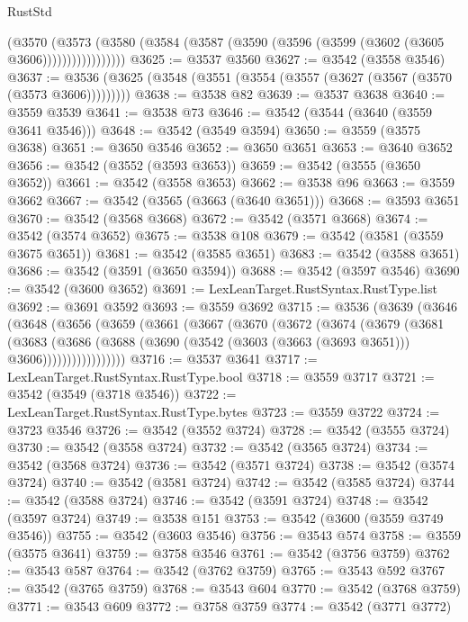 \begin{lexlean}{RustStd}
\begin{coremodule}
                  (@3570
                    (@3573
                      (@3580 (@3584 (@3587 (@3590 (@3596 (@3599 (@3602 (@3605 @3606)))))))))))))))))
@3625 := @3537 @3560
@3627 := @3542 (@3558 @3546)
@3637 := @3536 (@3625 (@3548 (@3551 (@3554 (@3557 (@3627 (@3567 (@3570 (@3573 @3606)))))))))
@3638 := @3538 @82
@3639 := @3537 @3638
@3640 := @3559 @3539
@3641 := @3538 @73
@3646 := @3542 (@3544 (@3640 (@3559 @3641 @3546)))
@3648 := @3542 (@3549 @3594)
@3650 := @3559 (@3575 @3638)
@3651 := @3650 @3546
@3652 := @3650 @3651
@3653 := @3640 @3652
@3656 := @3542 (@3552 (@3593 @3653))
@3659 := @3542 (@3555 (@3650 @3652))
@3661 := @3542 (@3558 @3653)
@3662 := @3538 @96
@3663 := @3559 @3662
@3667 := @3542 (@3565 (@3663 (@3640 @3651)))
@3668 := @3593 @3651
@3670 := @3542 (@3568 @3668)
@3672 := @3542 (@3571 @3668)
@3674 := @3542 (@3574 @3652)
@3675 := @3538 @108
@3679 := @3542 (@3581 (@3559 @3675 @3651))
@3681 := @3542 (@3585 @3651)
@3683 := @3542 (@3588 @3651)
@3686 := @3542 (@3591 (@3650 @3594))
@3688 := @3542 (@3597 @3546)
@3690 := @3542 (@3600 @3652)
@3691 := LexLeanTarget.RustSyntax.RustType.list
@3692 := @3691 @3592
@3693 := @3559 @3692
@3715 := @3536
    (@3639
      (@3646
        (@3648
          (@3656
            (@3659
              (@3661
                (@3667
                  (@3670
                    (@3672
                      (@3674
                        (@3679
                          (@3681
                            (@3683
                              (@3686
                                (@3688
                                  (@3690 (@3542 (@3603 (@3663 (@3693 @3651))) @3606)))))))))))))))))
@3716 := @3537 @3641
@3717 := LexLeanTarget.RustSyntax.RustType.bool
@3718 := @3559 @3717
@3721 := @3542 (@3549 (@3718 @3546))
@3722 := LexLeanTarget.RustSyntax.RustType.bytes
@3723 := @3559 @3722
@3724 := @3723 @3546
@3726 := @3542 (@3552 @3724)
@3728 := @3542 (@3555 @3724)
@3730 := @3542 (@3558 @3724)
@3732 := @3542 (@3565 @3724)
@3734 := @3542 (@3568 @3724)
@3736 := @3542 (@3571 @3724)
@3738 := @3542 (@3574 @3724)
@3740 := @3542 (@3581 @3724)
@3742 := @3542 (@3585 @3724)
@3744 := @3542 (@3588 @3724)
@3746 := @3542 (@3591 @3724)
@3748 := @3542 (@3597 @3724)
@3749 := @3538 @151
@3753 := @3542 (@3600 (@3559 @3749 @3546))
@3755 := @3542 (@3603 @3546)
@3756 := @3543 @574
@3758 := @3559 (@3575 @3641)
@3759 := @3758 @3546
@3761 := @3542 (@3756 @3759)
@3762 := @3543 @587
@3764 := @3542 (@3762 @3759)
@3765 := @3543 @592
@3767 := @3542 (@3765 @3759)
@3768 := @3543 @604
@3770 := @3542 (@3768 @3759)
@3771 := @3543 @609
@3772 := @3758 @3759
@3774 := @3542 (@3771 @3772)

\end{coremodule}
\end{lexlean}

